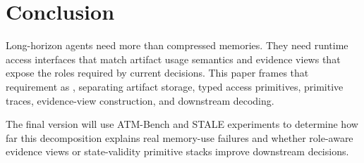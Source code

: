 \section{Conclusion}
\label{sec:conclusion}

Long-horizon agents need more than compressed memories.
They need runtime access interfaces that match artifact usage semantics and evidence views that expose the roles required by current decisions.
This paper frames that requirement as \methodname{}, separating artifact storage, typed access primitives, primitive traces, evidence-view construction, and downstream decoding.

The final version will use ATM-Bench and STALE experiments to determine how far this decomposition explains real memory-use failures and whether role-aware evidence views or state-validity primitive stacks improve downstream decisions.
